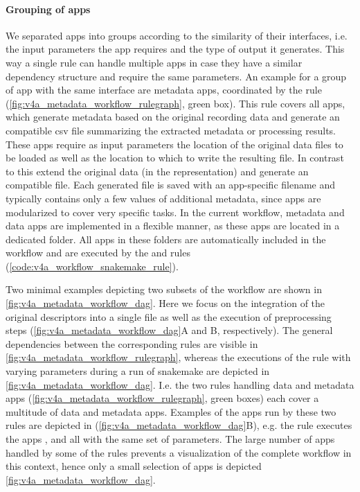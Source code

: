 \paragraph{Grouping of apps}
We separated apps into groups according to the similarity of their interfaces, i.e. the input parameters the app requires and the type of output it generates. This way a single rule can handle multiple apps in case they have a similar dependency structure and require the same parameters. An example for a group of app with the same interface are metadata apps, coordinated by the  rule (\cref{fig:v4a_metadata_workflow_rulegraph}, green box). This rule covers all apps, which generate metadata based on the original recording data and generate an  compatible csv file summarizing the extracted metadata or processing results. These apps require as input parameters the location of the original data files to be loaded as well as the location to which to write the resulting  file. In contrast to this  extend the original data (in the  representation) and generate an  compatible  file. Each generated  file is saved with an app-specific filename and typically contains only a few values of additional metadata, since apps are modularized to cover very specific tasks.
In the current workflow, metadata and data apps are implemented in a flexible manner, as these apps are located in a dedicated folder. All apps in these folders are automatically included in the workflow and are executed by the  and  rules (\cref{code:v4a_workflow_snakemake_rule}).

Two minimal examples depicting two subsets of the workflow are shown in \cref{fig:v4a_metadata_workflow_dag}. Here we focus on the integration of the original  descriptors into a single  file as well as the execution of preprocessing steps (\cref{fig:v4a_metadata_workflow_dag}A and B, respectively). The general dependencies between the corresponding rules are visible in \cref{fig:v4a_metadata_workflow_rulegraph}, whereas the executions of the rule with varying parameters during a run of snakemake are depicted in \cref{fig:v4a_metadata_workflow_dag}. I.e. the two rules handling data and metadata apps (\cref{fig:v4a_metadata_workflow_rulegraph}, green boxes) each cover a multitude of data and metadata apps. Examples of the apps run by these two rules are depicted in (\cref{fig:v4a_metadata_workflow_dag}B), e.g. the  rule executes the apps ,  and  all with the same set of parameters. The large number of apps handled by some of the rules prevents a visualization of the complete workflow in this context, hence only a small selection of apps is depicted \cref{fig:v4a_metadata_workflow_dag}.

